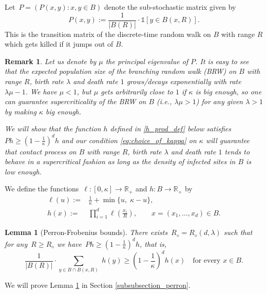 \documentclass[a4paper,12pt]{article}
\newtheorem  {lemma}         [theorem]{Lemma}
\newtheorem  {remark}        [theorem]{Remark}
\begin{document}
Let~$P = (P(x,y): x,y \in B)$ denote the sub-stochastic matrix given by
\begin{equation}\label{P_substoch_matrix}
 P(x,y) := \frac{1}{|B(R)|}\cdot \mathds{1} [y \in B(x,R)].
\end{equation}
This is the transition matrix of the discrete-time random walk on $B$ with range $R$ which gets killed if it jumps out of $B$.

\begin{remark}
Let us denote by $\mu$ the principal eigenvalue of $P$.   It is easy to see that the expected population size of the branching random walk (BRW) on $B$ with range $R$, birth rate $\lambda$ and death rate $1$ grows/decays exponentially with rate $\lambda \mu -1$. We have $\mu<1$, but $\mu$ gets arbitrarily close to $1$ if $\kappa$ is big enough, so one can guarantee supercriticality  of the BRW on $B$ (i.e., $\lambda \mu >1$) for any given $\lambda>1$ by making $\kappa$ big enough.

\smallskip

We will show that the function $h$ defined in \eqref{h_prod_def} below satisfies
$P h\geq (1-\frac{1}{\kappa})^d h$  and our condition \eqref{eq:choice_of_kappa} on $\kappa$ will guarantee that contact process on $B$
with range $R$, birth rate $\lambda$ and death rate $1$ tends to behave in a supercritical fashion as long as the density of infected sites in $B$ is low enough.
\end{remark}

We define the functions~$\ell: [0,\kappa] \to \mathbb{R}_+$ and $h: B \to \mathbb{R}_+$ by
\begin{align}
\label{eq:def_of_ell}
\ell(u) := &
\frac{1}{\kappa} + \min\{u,\;\kappa -u \}, \\
\label{h_prod_def}
 h(x) := & \prod_{i=1}^d \ell \left( \frac{x_i}{R} \right), \qquad x=(x_1,\ldots, x_d) \in B.
\end{align}

\begin{lemma}[Perron-Frobenius bounds]
\label{lem:first_bound_density}
There exists~$R_\diamond = R_\diamond(d,\lambda)$ such that for any~$R \ge R_\diamond$ we have~$Ph\geq (1-\frac{1}{\kappa})^d h$, that is,
\begin{equation}
 \label{eq:first_bound_density}
 \frac{1}{|B(R)|}\cdot \sum_{y \in B \cap B(x,R)}\;h(y)\geq \left(1-\frac{1}{\kappa}\right)^d   h(x)\quad \text{for every~$x \in B$}.
 \end{equation}
\end{lemma}
We will prove Lemma \ref{lem:first_bound_density} in Section \ref{subsubsection_perron}.
\end{document}
